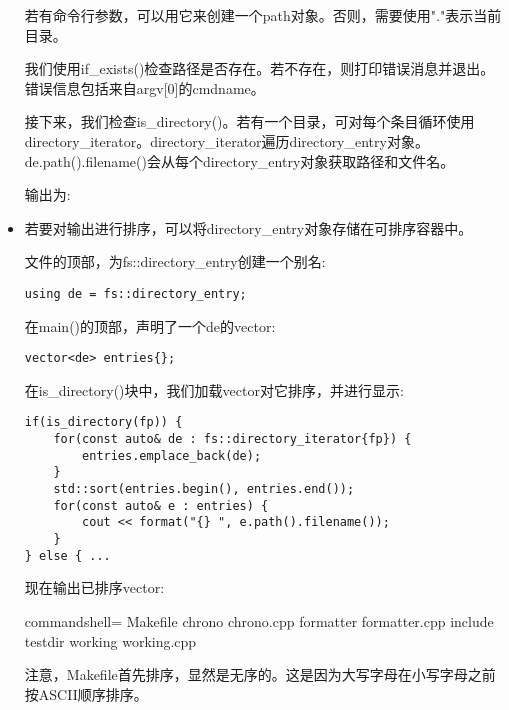 \begin{itemize}
若有命令行参数，可以用它来创建一个path对象。否则，需要使用"."表示当前目录。

我们使用if\_exists()检查路径是否存在。若不存在，则打印错误消息并退出。错误信息包括来自argv[0]的cmdname。

接下来，我们检查is\_directory()。若有一个目录，可对每个条目循环使用directory\_iterator。directory\_iterator遍历directory\_entry对象。de.path().filename()会从每个directory\_entry对象获取路径和文件名。

输出为:


\item 
若要对输出进行排序，可以将directory\_entry对象存储在可排序容器中。

文件的顶部，为fs::directory\_entry创建一个别名:

\begin{lstlisting}[style=styleCXX]
using de = fs::directory_entry;
\end{lstlisting}

在main()的顶部，声明了一个de的vector:

\begin{lstlisting}[style=styleCXX]
vector<de> entries{};
\end{lstlisting}

在is\_directory()块中，我们加载vector对它排序，并进行显示:

\begin{lstlisting}[style=styleCXX]
if(is_directory(fp)) {
	for(const auto& de : fs::directory_iterator{fp}) {
		entries.emplace_back(de);
	}
	std::sort(entries.begin(), entries.end());
	for(const auto& e : entries) {
		cout << format("{} ", e.path().filename());
	}
} else { ...
\end{lstlisting}

现在输出已排序vector:

\begin{tcblisting}{commandshell={}}
Makefile chrono chrono.cpp formatter formatter.cpp
include testdir working working.cpp
\end{tcblisting}

注意，Makefile首先排序，显然是无序的。这是因为大写字母在小写字母之前按ASCII顺序排序。


\end{itemize}
